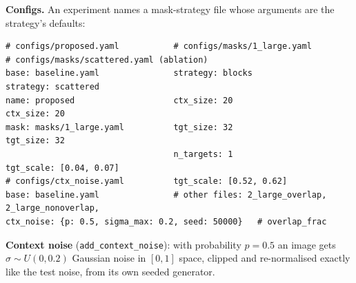 \textbf{Configs.} An experiment names a mask-strategy file whose arguments are the strategy's defaults:
\begin{lstlisting}
# configs/proposed.yaml           # configs/masks/1_large.yaml        # configs/masks/scattered.yaml (ablation)
base: baseline.yaml               strategy: blocks                    strategy: scattered
name: proposed                    ctx_size: 20                        ctx_size: 20
mask: masks/1_large.yaml          tgt_size: 32                        tgt_size: 32
                                  n_targets: 1                        tgt_scale: [0.04, 0.07]
# configs/ctx_noise.yaml          tgt_scale: [0.52, 0.62]
base: baseline.yaml               # other files: 2_large_overlap, 2_large_nonoverlap,
ctx_noise: {p: 0.5, sigma_max: 0.2, seed: 50000}   # overlap_frac
\end{lstlisting}
\textbf{Context noise} (\texttt{add\_context\_noise}): with probability $p{=}0.5$ an image gets $\sigma\sim U(0,0.2)$ Gaussian noise in $[0,1]$
space, clipped and re-normalised exactly like the test noise, from its own seeded generator.
